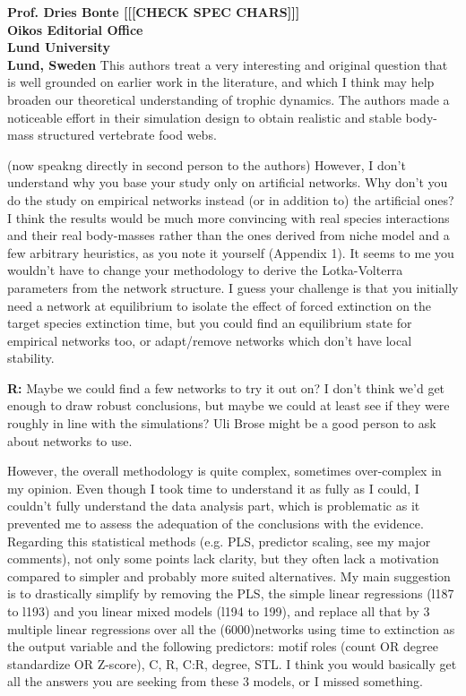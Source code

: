 \documentclass[12pt]{letter}
\begin{document}
\begin{letter}{\bf Prof. Dries Bonte [[[CHECK SPEC CHARS]]]\\
Oikos Editorial Office \\
Lund University \\
Lund, Sweden}
  This authors treat a very interesting and original question that is well grounded on earlier work in the literature, and which I think may help broaden our theoretical understanding of trophic dynamics. The authors made a noticeable effort in their simulation design to obtain realistic and stable body-mass structured vertebrate food webs.

  (now speakng directly in second person to the authors) However, I don’t understand why you base your study only on artificial networks. Why don’t you do the study on empirical networks instead (or in addition to) the artificial ones? I think the results would be much more convincing with real species interactions and their real body-masses rather than the ones derived from niche model and a few arbitrary heuristics, as you note it yourself (Appendix 1). It seems to me you wouldn’t have to change your methodology to derive the Lotka-Volterra parameters from the network structure. I guess your challenge is that you initially need a network at equilibrium to isolate the effect of forced extinction on the target species extinction time, but you could find an equilibrium state for empirical networks too, or adapt/remove networks which don’t have local stability.

  \textbf{R:}
  Maybe we could find a few networks to try it out on? I don't think we'd get enough to draw robust conclusions, but maybe we could at least see if they were roughly in line with the simulations? Uli Brose might be a good person to ask about networks to use.

  However, the overall methodology is quite complex, sometimes over-complex in my opinion. Even though I took time to understand it as fully as I could, I couldn’t fully understand the data analysis part, which is problematic as it prevented me to assess the adequation of the conclusions with the evidence. Regarding this statistical methods (e.g. PLS, predictor scaling, see my major comments), not only some points lack clarity, but they often lack a motivation compared to simpler and probably more suited alternatives. My main suggestion is to drastically simplify by removing the PLS, the simple linear regressions (l187 to l193) and you linear mixed models (l194 to 199), and replace all that by 3 multiple linear regressions over all the (6000)networks using time to extinction as the output variable and the following predictors: motif roles (count OR degree standardize OR Z-score), C, R, C:R, degree, STL. I think you would basically get all the answers you are seeking from these 3 models, or I missed something.


\end{letter}
\end{document}
